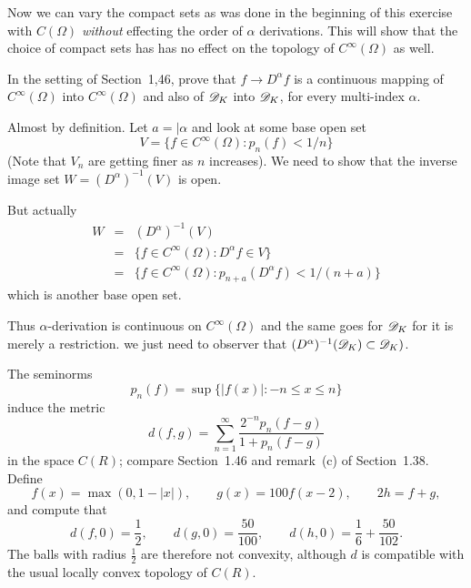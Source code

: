 \begin{enumerate}
Now we can vary the compact sets as was done 
in the beginning of this exercise with \(C(\Omega)\)
\emph{without} effecting the order of \(\alpha\) derivations.
This will show that the choice of compact sets has 
has no effect on the topology of \(C^\infty(\Omega)\) as well.

\begin{excopy}
In the setting of Section~1,46, prove that \(f\rightarrow D^\alpha f\)
is a continuous mapping of 
\(C^\infty(\Omega)\) into \(C^\infty(\Omega)\)  and also of
\(\mathscr{D}_K\) into \(\mathscr{D}_K\),
for every multi-index \(\alpha\).
\end{excopy}

Almost by definition. Let \(a=|\alpha\) and look at some base open set
\begin{equation*}
 V = \{f\in C^\infty(\Omega): p_n(f)< 1/n\}
\end{equation*}
(Note that \(V_n\) are getting finer as $n$ increases).
We need to show that the inverse image set \(W = (D^\alpha)^{-1}(V)\) is open.

But actually
\begin{eqnarray*}
 W 
 &=&  (D^\alpha)^{-1}(V) \\
 &=&  \{f\in C^\infty(\Omega): D^\alpha f \in V\} \\
 &=&  \{f\in C^\infty(\Omega): p_{n+a}(D^\alpha f)< 1/(n+a)\}
\end{eqnarray*}
which is another base open set.

Thus \(\alpha\)-derivation is continuous on \(C^\infty(\Omega)\)
and the same goes for \(\mathscr{D}_K\) for it is merely
a restriction. we just need to observer that 
\((D^\alpha)^{-1}(\mathscr{D}_K) \subset \mathscr{D}_K)\).



\begin{excopy}
The seminorms \label{ex:1:18}
\begin{equation*}
 p_n(f) = \sup\{|f(x)|: -n \leq x \leq n\}
\end{equation*}
induce the metric
\begin{equation*}
  d(f,g) = \sum_{n=1}^\infty \frac{2^{-n} p_n(f-g)}{1 +  p_n(f-g)}
\end{equation*}
in the space \(C(R)\); compare Section~1.46 and remark~(c) of
Section~1.38.
Define
\begin{equation*}
 f(x) = \max(0,1-|x|), \qquad g(x) = 100f(x-2), \qquad 2h = f+g,
\end{equation*}
and compute that
\begin{equation*}
 d(f,0)=\frac{1}{2}, \qquad d(g,0) = \frac{50}{100}, 
                     \qquad d(h,0) = \frac{1}{6}+\frac{50}{102}.
\end{equation*}
The balls with radius \(\frac{1}{2}\) are therefore not convexity, although $d$
is compatible  with the usual locally convex topology of \(C(R)\).
\end{excopy}


\end{enumerate}
